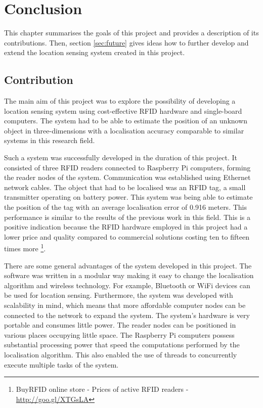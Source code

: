 \chapter{Conclusion}
\label{ch:conclusion}

This chapter summarises the goals of this project and provides a description of its contributions. Then, section \ref{sec:future} gives ideas how to further develop and extend the location sensing system created in this project.

\section{Contribution}

The main aim of this project was to explore the possibility of developing a location sensing system using cost-effective RFID hardware and single-board computers. The system had to be able to estimate the position of an unknown object in three-dimensions with a localisation accuracy comparable to similar systems in this research field.

Such a system was successfully developed in the duration of this project. It consisted of three RFID readers connected to  Raspberry Pi computers, forming the reader nodes of the system. Communication was established using Ethernet network cables. The object that had to be localised was an RFID tag, a small transmitter operating on battery power. This system was being able to estimate the position of the tag with an average localisation error of 0.916 meters. This performance is similar to the results of the previous work in this field. This is a positive indication because the RFID hardware employed in this project had a lower price and quality compared to commercial solutions costing ten to fifteen times more \footnote{BuyRFID online store - Prices of active RFID readers - \url{http://goo.gl/XTGsLA}}.

There are some general advantages of the system developed in this project. The software was written in a modular way making it easy to change the localisation algorithm and wireless technology. For example, Bluetooth or WiFi devices can be used for location sensing. Furthermore, the system was developed with scalability in mind, which means that more affordable computer nodes can be connected to the network to expand the system. The system's hardware is very portable and consumes little power. The reader nodes can be positioned in various places occupying little space. The Raspberry Pi computers possess substantial processing power that speed the computations performed by the localisation algorithm. This also enabled the use of threads to concurrently execute multiple tasks of the system.

